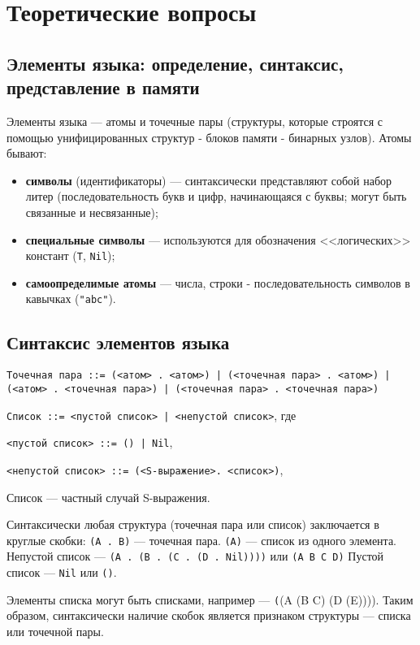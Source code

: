 \documentclass[14pt,a4paper]{scrreprt}
\begin{document}


\thispagestyle{empty}

\chapter{Теоретические вопросы}

\section{Элементы языка: определение, синтаксис, представление в памяти}

Элементы языка --- атомы и точечные пары (структуры, которые строятся с помощью унифицированных структур - блоков памяти - бинарных узлов). Атомы бывают:
\begin{itemize}
	\item \textbf{символы} (идентификаторы) --- синтаксически представляют собой набор литер (последовательность букв и цифр, начинающаяся с буквы; могут быть связанные и несвязанные);
	\item \textbf{специальные символы} --- используются для обозначения <<логических>> констант (\texttt{T}, \texttt{Nil});
	\item \textbf{самоопределимые атомы} --- числа, строки - последовательность символов в кавычках (\texttt{"abc"}).
\end{itemize}

\section{Синтаксис элементов языка}

\texttt{Точечная пара ::= (<атом> . <атом>) | (<точечная пара> . <атом>) | (<атом> . <точечная пара>) | (<точечная пара> . <точечная пара>)}

\texttt{Список ::= <пустой список> | <непустой список>}, где 

\texttt{<пустой список> ::= () | Nil},

\texttt{<непустой список> ::= (<S-выражение>. <список>)},

Список --- частный случай S-выражения.

Синтаксически любая структура (точечная пара или список) заключается в круглые скобки:
\texttt{(A . B)} --- точечная пара.
\texttt{(A)} --- список из одного элемента.
Непустой список --- \texttt{(A . (B . (C . (D . Nil))))} или \texttt{(A B C D)}
Пустой список --- \texttt{Nil} или \texttt{()}.

Элементы списка могут быть списками, например --- \texttt((A (B C) (D (E)))). Таким образом, синтаксически наличие скобок является признаком структуры --- списка или точечной пары.
\end{document}
